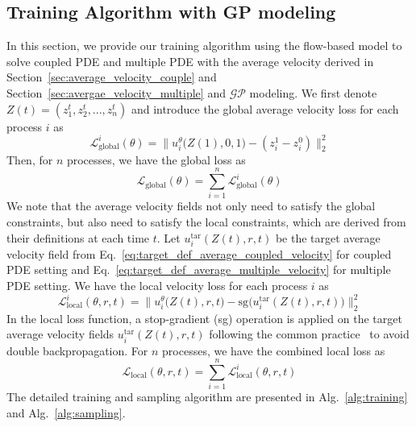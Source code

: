 \documentclass{article}
\begin{document}
\subsection{Training Algorithm with GP modeling}
In this section, we provide our training algorithm using the flow-based model to solve coupled PDE and multiple PDE with the average velocity derived in Section~\ref{sec:average_velocity_couple} and Section~\ref{sec:avergae_velocity_multiple} and $\mathcal{GP}$ modeling. We first denote $Z(t) = (z^t_1, z^t_2, ..., z^t_n)$ and introduce the global average velocity loss for each process $i$ as 
\begin{equation}
    \mathcal{L}^{i}_{\text{global}}(\theta) = \|u^{\theta}_i\big(Z(1), 0,1 \big) - (z^1_i - z^0_i)\|^2_2 \label{eq:global_gp_loss_i}
\end{equation}
Then, for $n$ processes, we have the global loss as
\begin{equation}
    \mathcal{L}_{\text{global}}(\theta) = \sum_{i=1}^{n}  \mathcal{L}^{i}_{\text{global}}(\theta)\label{eq:global_gp_loss}
\end{equation}
We note that the average velocity fields not only need to satisfy the global constraints, but also need to satisfy the local constraints, which are derived from their definitions at each time $t$. Let $u_i^{\text{tar}}(Z(t),r,t)$ be the target average velocity field from Eq.~\ref{eq:target_def_average_coupled_velocity} for coupled PDE setting and Eq.~\ref{eq:target_def_average_multiple_velocity} for multiple PDE setting. We have the local velocity loss for each process $i$ as 
\begin{equation}
    \mathcal{L}^{i}_{\text{local}}(\theta, r,t) = \|u^{\theta}_i\big(Z(t), r,t\big) - \text{sg}\big(u_i^{\text{tar}}(Z(t),r,t)\big) \|^2_2 \label{eq:local_gp_loss_i}
\end{equation}
In the local loss function, a stop-gradient (sg) operation is applied on the target average velocity fields $u_i^{\text{tar}}(Z(t),r,t)$ following the common practice~\citep{geng2025mean} to avoid double backpropagation. For $n$ processes, we have the combined local loss as
\begin{equation}
    \mathcal{L}_{\text{local}}(\theta, r,t) = \sum_{i=1}^{n}\mathcal{L}^{i}_{\text{local}}(\theta, r,t) \label{eq:local_gp_loss}
\end{equation}
The detailed training and sampling algorithm are presented in Alg.~\ref{alg:training} and Alg.~\ref{alg:sampling}. 
\end{document}

